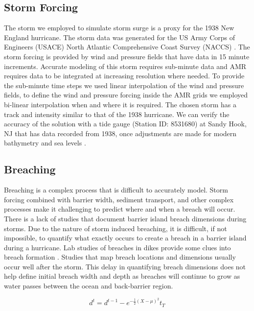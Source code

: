 \documentclass{coastal_paper}
\begin{document}
\subsection{Storm Forcing}
The storm we employed to simulate storm surge is a proxy for the 1938 New England hurricane. The storm data was generated for the US Army Corps of Engineers (USACE) North Atlantic Comprehensive Coast Survey (NACCS) \citep{cialone2015north}. The storm forcing is provided by wind and pressure fields that have data in 15 minute increments. Accurate modeling of this storm requires sub-minute data and AMR requires data to be integrated at increasing resolution where needed. To provide the sub-minute time steps we used linear interpolation of the wind and pressure fields, to define the wind and pressure forcing inside the AMR grids we employed bi-linear interpolation when and where it is required. The chosen storm has a track and intensity similar to that of the 1938 hurricane. We can verify the accuracy of the solution with a tide gauge (Station ID: 8531680) at Sandy Hook, NJ that has data recorded from 1938, once adjustments are made for modern bathymetry and sea levels \citep{coops2007}. 

\subsection{Breaching}
Breaching is a complex process that is difficult to accurately model. Storm forcing combined with barrier width, sediment transport, and other complex processes make it challenging to predict where and when a breach will occur. There is a lack of studies that document barrier island breach dimensions during storms. Due to the nature of storm induced breaching, it is difficult, if not impossible, to quantify what exactly occurs to create a breach in a barrier island during a hurricane. Lab studies of breaches in dikes provide some clues into breach formation \citep{visser1999breach}. Studies that map breach locations and dimensions usually occur well after the storm. This delay in quantifying breach dimensions does not help define initial breach width and depth as breaches will continue to grow as water passes between the ocean and back-barrier region.

\begin{equation}
    d^t = d^{t-1} - e^{-\frac{1}{2}{(X - \mu)^2}}t_T
    \label{eq:breach_gaussian}
\end{equation}
\end{document}
